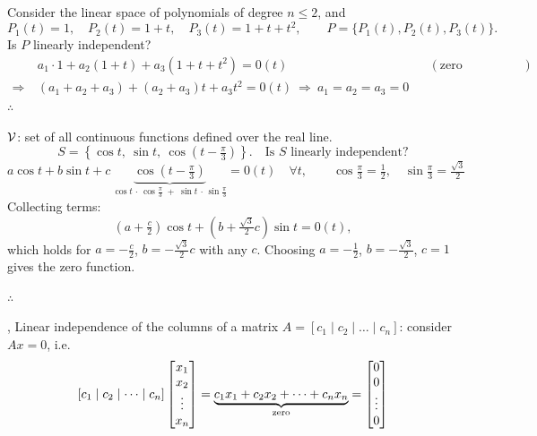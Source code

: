 \begin{example}
Consider the linear space of polynomials of degree $n\le2$, and
\[
P_1(t)=1, \quad P_2(t)=1+t, \quad P_3(t)=1+t+t^2, \qquad P=\{P_1(t),P_2(t),P_3(t)\}.
\]
Is $P$ linearly independent?
\begin{align*}
& a_1\cdot1+a_2(1+t)+a_3(1+t+t^2) = 0(t) && (\text{zero polynomial})\\
\Rightarrow\ & (a_1+a_2+a_3)+(a_2+a_3)t+a_3t^2 = 0(t) \ \Rightarrow\ a_1=a_2=a_3=0
\end{align*}
$\therefore$ 
\end{example}

\begin{example}
$\mathcal{V}$: set of all continuous functions defined over the real line.
\[ S = \left\{ \cos t,\ \sin t,\ \cos\!\left(t-\tfrac{\pi}{3}\right) \right\}. \quad \text{Is $S$ linearly independent?} \]
\[
a\cos t+b\sin t+c\,
\underbrace{\cos\!\left(t-\tfrac{\pi}{3}\right)}_{\cos t\,\cdot\,\cos\frac{\pi}{3}\;+\;\sin t\,\cdot\,\sin\frac{\pi}{3}} = 0(t)\quad \forall t,
\qquad \cos\tfrac{\pi}{3} = \tfrac12,\quad \sin\tfrac{\pi}{3} = \tfrac{\sqrt3}{2}
\]
Collecting terms:
\[ \left(a+\tfrac{c}{2}\right)\cos t+\left(b+\tfrac{\sqrt3}{2}c\right)\sin t = 0(t), \]
which holds for $a=-\tfrac{c}{2}$, $b=-\tfrac{\sqrt3}{2}c$ with any $c$. Choosing $a=-\tfrac12$, $b=-\tfrac{\sqrt3}{2}$, $c=1$ gives the zero function.

$\therefore$ 
\end{example}

\sep
Linear independence of the columns of a matrix $A = [c_1 \mid c_2 \mid \dots \mid c_n]$: consider $Ax=0$, i.e.
\[
[c_1 \mid c_2 \mid \dots \mid c_n]\begin{bmatrix}x_1\\x_2\\\vdots\\x_n\end{bmatrix}
= \underbrace{c_1x_1+c_2x_2+\dots+c_nx_n}_{\text{zero}} = \begin{bmatrix}0\\0\\\vdots\\0\end{bmatrix}
\]

